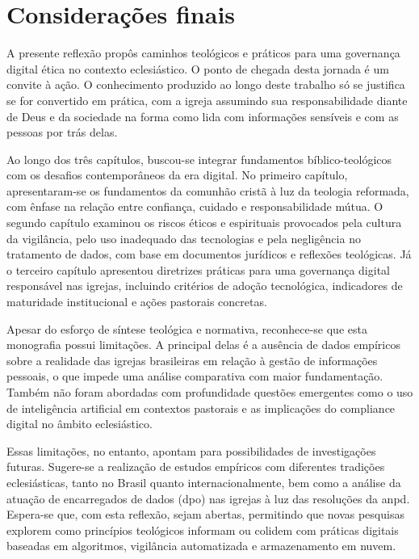 \newpage
\newcommand{\tituloConsideracoesFinais}{Considerações finais}

\chapter*{\tituloConsideracoesFinais}
\addcontentsline{toc}{section}{\MakeUppercase{\tituloConsideracoesFinais}}

A presente reflexão propôs caminhos teológicos e práticos para uma governança digital ética no contexto eclesiástico. O ponto de chegada desta jornada é um convite à ação. O conhecimento produzido ao longo deste trabalho só se justifica se for convertido em prática, com a igreja assumindo sua responsabilidade diante de Deus e da sociedade na forma como lida com informações sensíveis e com as pessoas por trás delas.

Ao longo dos três capítulos, buscou-se integrar fundamentos bíblico-teológicos com os desafios contemporâneos da era digital. No primeiro capítulo, apresentaram-se os fundamentos da comunhão cristã à luz da teologia reformada, com ênfase na relação entre confiança, cuidado e responsabilidade mútua. O segundo capítulo examinou os riscos éticos e espirituais provocados pela cultura da vigilância, pelo uso inadequado das tecnologias e pela negligência no tratamento de dados, com base em documentos jurídicos e reflexões teológicas. Já o terceiro capítulo apresentou diretrizes práticas para uma governança digital responsável nas igrejas, incluindo critérios de adoção tecnológica, indicadores de maturidade institucional e ações pastorais concretas.

Apesar do esforço de síntese teológica e normativa, reconhece-se que esta monografia possui limitações. A principal delas é a ausência de dados empíricos sobre a realidade das igrejas brasileiras em relação à gestão de informações pessoais, o que impede uma análise comparativa com maior fundamentação. Também não foram abordadas com profundidade questões emergentes como o uso de inteligência artificial em contextos pastorais e as implicações do compliance digital no âmbito eclesiástico.

Essas limitações, no entanto, apontam para possibilidades de investigações futuras. Sugere-se a realização de estudos empíricos com diferentes tradições eclesiásticas, tanto no Brasil quanto internacionalmente, bem como a análise da atuação de encarregados de dados (\gls{dpo}) nas igrejas à luz das resoluções da \gls{anpd}. Espera-se que, com esta reflexão, sejam abertas, permitindo que novas pesquisas explorem como princípios teológicos informam ou colidem com práticas digitais baseadas em algoritmos, vigilância automatizada e armazenamento em nuvem.

